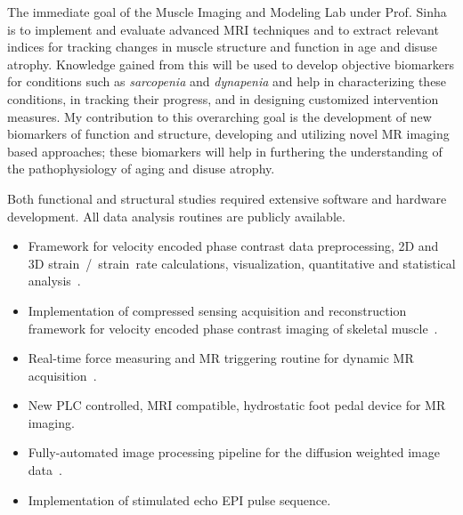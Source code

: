 The immediate goal of the Muscle Imaging and Modeling Lab under Prof. Sinha is to implement and evaluate advanced MRI techniques and to extract relevant indices for tracking changes in muscle structure and function in age and disuse atrophy. 
Knowledge gained from this will be used to develop objective biomarkers for conditions such as \textit{sarcopenia} and \textit{dynapenia} and help in characterizing these conditions, in tracking their progress, and in designing customized intervention measures. 
My contribution to this overarching goal is the development of new biomarkers of function and structure, developing and utilizing novel MR imaging based approaches; 	these biomarkers will help in furthering the understanding of the pathophysiology of aging and disuse atrophy.

Both functional and structural studies required extensive software and hardware development. All data analysis routines are publicly available.
\begin{itemize}
\item Framework for velocity encoded phase contrast data preprocessing, 2D and 3D strain~/~strain~rate calculations, visualization, quantitative and statistical analysis~\cite{2DSR, 3DSR}.
\item Implementation of compressed sensing acquisition and reconstruction framework for velocity encoded phase contrast imaging of skeletal muscle~\cite{3DSR}.
\item Real-time force measuring and MR triggering routine for dynamic MR acquisition~\cite{LabView}.
\item New PLC controlled, MRI compatible, hydrostatic foot pedal device for MR imaging.
\item Fully-automated image processing pipeline for the diffusion weighted image data~\cite{DTI}.
\item Implementation of stimulated echo EPI pulse sequence.
\end{itemize}